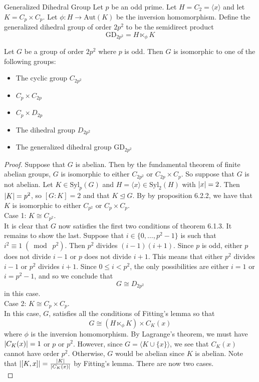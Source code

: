 \documentclass[a4paper]{article}
\begin{document}
\begin{defn}{Generalized Dihedral Group}{} Let $p$ be an odd prime. Let $H=C_2=\langle x\rangle$ and let $K=C_p\times C_p$. Let $\phi:H\to\text{Aut}(K)$ be the inversion homomorphism. Define the generalized dihedral group of order $2p^2$ to be the semidirect product $$\text{GD}_{2p^2}=H\ltimes_\phi K$$
\end{defn}

\begin{prp}{}{} Let $G$ be a group of order $2p^2$ where $p$ is odd. Then $G$ is isomorphic to one of the following groups: 
\begin{itemize}
\item The cyclic group $C_{2p^2}$
\item $C_p\times C_{2p}$
\item $C_p\times D_{2p}$
\item The dihedral group $D_{2p^2}$
\item The generalized dihedral group $\text{GD}_{2p^2}$
\end{itemize} 
\begin{proof}
Suppose that $G$ is abelian. Then by the fundamental theorem of finite abelian groups, $G$ is isomorphic to either $C_{2p^2}$ or $C_{2p}\times C_p$. So suppose that $G$ is not abelian. Let $K\in\text{Syl}_p(G)$ and $H=\langle x\rangle\in\text{Syl}_2(H)$ with $\abs{x}=2$. Then $\abs{K}=p^2$, so $[G:K]=2$ and that $K\trianglelefteq G$. By by proposition 6.2.2, we have that $K$ is isomorphic to either $C_{p^2}$ or $C_p\times C_p$. \\

Case 1: $K\cong C_{p^2}$. \\
It is clear that $G$ now satisfies the first two conditions of theorem 6.1.3. It remains to show the last. Suppose that $i\in\{0,\dots,p^2-1\}$ is such that $i^2\equiv 1\;(\bmod\;p^2)$. Then $p^2$ divides $(i-1)(i+1)$. Since $p$ is odd, either $p$ does not divide $i-1$ or $p$ does not divide $i+1$. This means that either $p^2$ divides $i-1$ or $p^2$ divides $i+1$. Since $0\leq i<p^2$, the only possibilities are either $i=1$ or $i=p^2-1$, and so we conclude that $$G\cong D_{2p^2}$$ in this case. \\

Case 2: $K\cong C_p\times C_p$. \\
In this case, $G$, satisfies all the conditions of Fitting's lemma so that $$G\cong(H\ltimes_\phi K)\times C_K(x)$$ where $\phi$ is the inversion homomorphism. By Lagrange's theorem, we must have $\abs{C_K(x)}=1$ or $p$ or $p^2$. However, since $G=\langle K\cup\{x\}\rangle$, we see that $C_K(x)$ cannot have order $p^2$. Otherwise, $G$ would be abelian since $K$ is abelian.  Note that $\abs{[K,x]}=\frac{\abs{K}}{\abs{C_K(x)}}$ by Fitting's lemma. There are now two cases. \\


\end{proof}
\end{prp}
\end{document}
